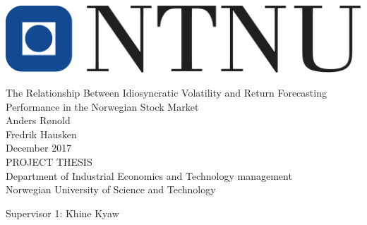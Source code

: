 \thispagestyle{empty}
\includegraphics[scale=0.4]{Pictures/ntnu.png}
\mbox{}\\[6pc]
\begin{center}
\Huge{The Relationship Between Idiosyncratic Volatility and Return Forecasting Performance in the Norwegian Stock Market}\\[2pc]

\Large{Anders Rønold \\ Fredrik Hausken}\\[1pc]
\large{December 2017}\\[2pc]

PROJECT THESIS\\
Department of Industrial Economics and Technology management\\
Norwegian University of Science and Technology
\end{center}
\vfill

\noindent Supervisor 1: Khine Kyaw


